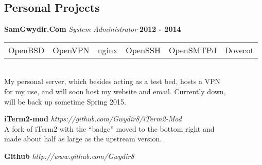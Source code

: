\documentclass[margin,line,12pt]{res}
\begin{document}
{\begin{resume}
{  \section{\sc Personal Projects}}
\color{black}
{\bf SamGwydir.Com} {\em System Administrator} \hfill {\bf 2012 - 2014} \
\\
\begin{tabular}{l l l l l l}
  OpenBSD &  OpenVPN &  nginx &  OpenSSH & OpenSMTPd & Dovecot
\end{tabular}
\\
My personal server, which besides acting as a test bed, hosts a VPN \\
for my use, and will soon host my website and email. Currently down, \\
 will be back up sometime Spring 2015.
%

{\bf iTerm2-mod} {\em  https://github.com/Gwydir8/iTerm2-Mod}  \
\\
A fork of iTerm2 with the ``badge'' moved to the bottom right and \\
made about half as large as the upstream version.

{\bf Github} {\em http://www.github.com/Gwydir8}  \

\vspace*{.20in}
{\color{Black}
  \vspace{-.10in}
}
\end{resume}}
\end{document}
